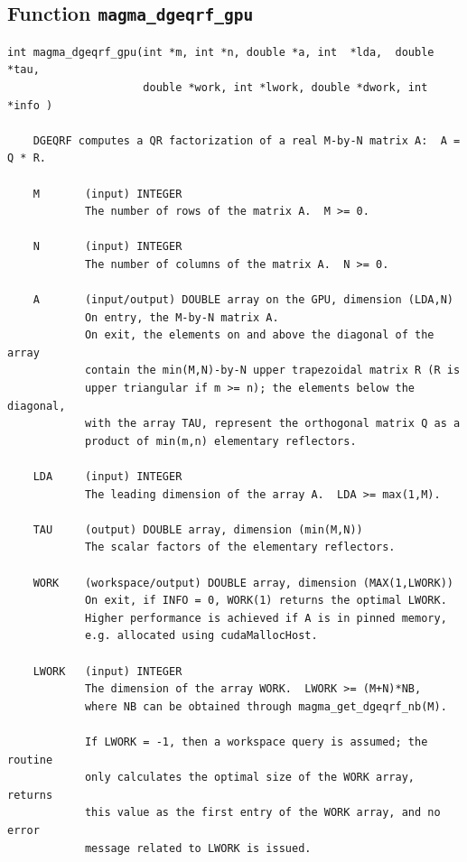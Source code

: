 \documentclass[10pt]{book}
\begin{document}
\newpage
\subsection{Function {\tt {\bf magma\_dgeqrf\_gpu}}}
\begin{verbatim}
int magma_dgeqrf_gpu(int *m, int *n, double *a, int  *lda,  double  *tau,
                     double *work, int *lwork, double *dwork, int *info )
   
    DGEQRF computes a QR factorization of a real M-by-N matrix A:  A = Q * R.   

    M       (input) INTEGER   
            The number of rows of the matrix A.  M >= 0.   

    N       (input) INTEGER   
            The number of columns of the matrix A.  N >= 0.   

    A       (input/output) DOUBLE array on the GPU, dimension (LDA,N)   
            On entry, the M-by-N matrix A.   
            On exit, the elements on and above the diagonal of the array   
            contain the min(M,N)-by-N upper trapezoidal matrix R (R is   
            upper triangular if m >= n); the elements below the diagonal,   
            with the array TAU, represent the orthogonal matrix Q as a   
            product of min(m,n) elementary reflectors.

    LDA     (input) INTEGER   
            The leading dimension of the array A.  LDA >= max(1,M).   

    TAU     (output) DOUBLE array, dimension (min(M,N))   
            The scalar factors of the elementary reflectors.   

    WORK    (workspace/output) DOUBLE array, dimension (MAX(1,LWORK))   
            On exit, if INFO = 0, WORK(1) returns the optimal LWORK.   
            Higher performance is achieved if A is in pinned memory, 
            e.g. allocated using cudaMallocHost.

    LWORK   (input) INTEGER   
            The dimension of the array WORK.  LWORK >= (M+N)*NB,   
            where NB can be obtained through magma_get_dgeqrf_nb(M).

            If LWORK = -1, then a workspace query is assumed; the routine   
            only calculates the optimal size of the WORK array, returns   
            this value as the first entry of the WORK array, and no error   
            message related to LWORK is issued.   


\end{verbatim}
\end{document}
